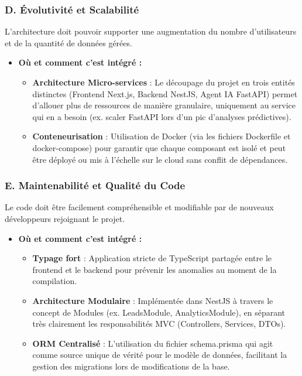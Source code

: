 \subsubsection{D. Évolutivité et Scalabilité}

L’architecture doit pouvoir supporter une augmentation du nombre d’utilisateurs et de la quantité de données gérées.

\begin{itemize}
    \item \textbf{Où et comment c’est intégré :}
    \begin{itemize}
        \item \textbf{Architecture Micro-services} : Le découpage du projet en trois entités distinctes (Frontend Next.js, Backend NestJS, Agent IA FastAPI) permet d’allouer plus de ressources de manière granulaire, uniquement au service qui en a besoin (ex. scaler FastAPI lors d’un pic d’analyses prédictives).
        \item \textbf{Conteneurisation} : Utilisation de Docker (via les fichiers Dockerfile et docker-compose) pour garantir que chaque composant est isolé et peut être déployé ou mis à l’échelle sur le cloud sans conflit de dépendances.
    \end{itemize}
\end{itemize}

\subsubsection{E. Maintenabilité et Qualité du Code}

Le code doit être facilement compréhensible et modifiable par de nouveaux développeurs rejoignant le projet.

\begin{itemize}
    \item \textbf{Où et comment c’est intégré :}
    \begin{itemize}
        \item \textbf{Typage fort} : Application stricte de TypeScript partagée entre le frontend et le backend pour prévenir les anomalies au moment de la compilation.
        \item \textbf{Architecture Modulaire} : Implémentée dans NestJS à travers le concept de Modules (ex. LeadsModule, AnalyticsModule), en séparant très clairement les responsabilités MVC (Controllers, Services, DTOs).
        \item \textbf{ORM Centralisé} : L’utilisation du fichier schema.prisma qui agit comme source unique de vérité pour le modèle de données, facilitant la gestion des migrations lors de modifications de la base.
    \end{itemize}
\end{itemize}

